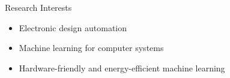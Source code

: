 
\begin{rSection}{Research Interests}
\begin{itemize}
    \item Electronic design automation
    \item Machine learning for computer systems
    \item Hardware-friendly and energy-efficient machine learning
\end{itemize}
\end{rSection}

\iffalse
\begin{rSection}{Research Topics}
	\begin{itemize}
		\item Layout Optimization  \\%
		 - Propose a framework to combine layout decomposition and mask optimization into one stage.
		\item Standard Cell Synthesis   \\%
		 - Develop an algorithm of generating standard cell layouts of regular style.
		\item Adder Synthesis  \\%
		 - Propose a machine learning based methodology to search for best performance-area/power trade-off adders.
	\end{itemize}
\end{rSection}
\fi

